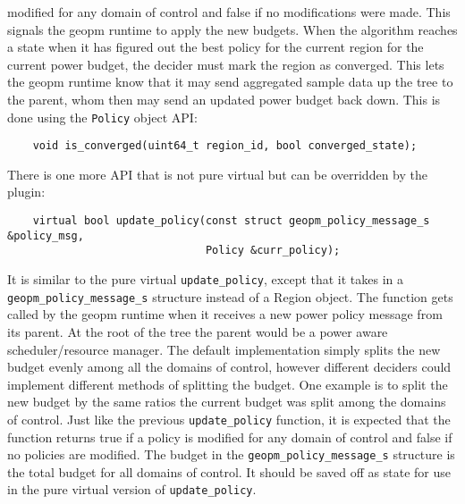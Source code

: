 \documentclass[11pt]{article}
\begin{document}
modified for any domain of control and false if no modifications were
made. This signals the geopm runtime to apply the new budgets.  When
the algorithm reaches a state when it has figured out the best policy
for the current region for the current power budget, the decider must
mark the region as converged. This lets the geopm runtime know that it
may send aggregated sample data up the tree to the parent, whom then
may send an updated power budget back down. This is done using the
\verb#Policy# object API:
\begin{verbatim}
    void is_converged(uint64_t region_id, bool converged_state);
\end{verbatim}
There is one more API that is not pure virtual but can be overridden
by the plugin:
\begin{verbatim}
    virtual bool update_policy(const struct geopm_policy_message_s &policy_msg,
                               Policy &curr_policy);
\end{verbatim}
It is similar to the pure virtual \verb#update_policy#, except that it
takes in a \verb#geopm_policy_message_s# structure instead of a Region
object. The function gets called by the geopm runtime when it receives
a new power policy message from its parent. At the root of the tree
the parent would be a power aware scheduler/resource manager. The
default implementation simply splits the new budget evenly among all
the domains of control, however different deciders could implement
different methods of splitting the budget. One example is to split the
new budget by the same ratios the current budget was split among the
domains of control. Just like the previous \verb#update_policy#
function, it is expected that the function returns true if a policy is
modified for any domain of control and false if no policies are
modified. The budget in the \verb#geopm_policy_message_s# structure is
the total budget for all domains of control. It should be saved off as
state for use in the pure virtual version of \verb#update_policy#.
\end{document}
